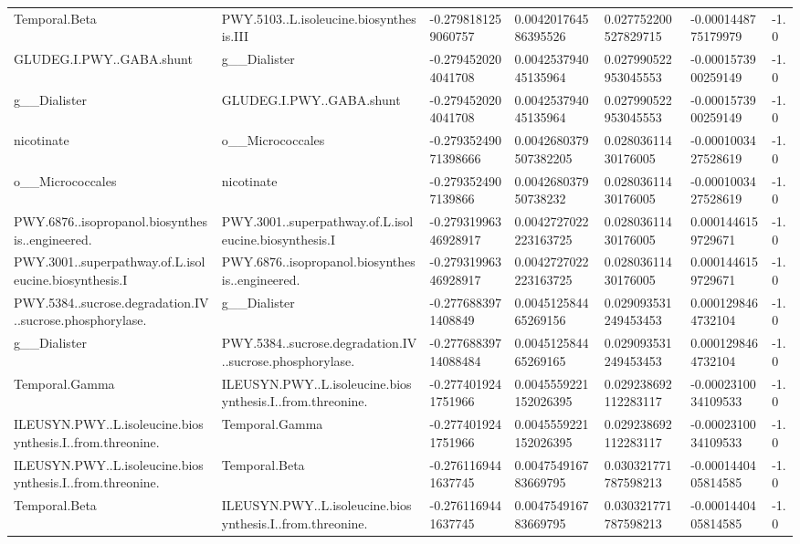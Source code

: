 \begin{longtable}{lllllll}
Temporal.Beta & PWY.5103..L.isoleucine.biosynthesis.III & -0.2798181259060757 & 0.004201764586395526 & 0.027752200527829715 & -0.0001448775179979 & -1.0 \\
GLUDEG.I.PWY..GABA.shunt & g\_\_Dialister & -0.2794520204041708 & 0.004253794045135964 & 0.027990522953045553 & -0.0001573900259149 & -1.0 \\
g\_\_Dialister & GLUDEG.I.PWY..GABA.shunt & -0.2794520204041708 & 0.004253794045135964 & 0.027990522953045553 & -0.0001573900259149 & -1.0 \\
nicotinate & o\_\_Micrococcales & -0.27935249071398666 & 0.0042680379507382205 & 0.02803611430176005 & -0.0001003427528619 & -1.0 \\
o\_\_Micrococcales & nicotinate & -0.2793524907139866 & 0.004268037950738232 & 0.02803611430176005 & -0.0001003427528619 & -1.0 \\
PWY.6876..isopropanol.biosynthesis..engineered. & PWY.3001..superpathway.of.L.isoleucine.biosynthesis.I & -0.27931996346928917 & 0.0042727022223163725 & 0.02803611430176005 & 0.0001446159729671 & -1.0 \\
PWY.3001..superpathway.of.L.isoleucine.biosynthesis.I & PWY.6876..isopropanol.biosynthesis..engineered. & -0.27931996346928917 & 0.0042727022223163725 & 0.02803611430176005 & 0.0001446159729671 & -1.0 \\
PWY.5384..sucrose.degradation.IV..sucrose.phosphorylase. & g\_\_Dialister & -0.2776883971408849 & 0.004512584465269156 & 0.029093531249453453 & 0.0001298464732104 & -1.0 \\
g\_\_Dialister & PWY.5384..sucrose.degradation.IV..sucrose.phosphorylase. & -0.27768839714088484 & 0.004512584465269165 & 0.029093531249453453 & 0.0001298464732104 & -1.0 \\
Temporal.Gamma & ILEUSYN.PWY..L.isoleucine.biosynthesis.I..from.threonine. & -0.2774019241751966 & 0.0045559221152026395 & 0.029238692112283117 & -0.0002310034109533 & -1.0 \\
ILEUSYN.PWY..L.isoleucine.biosynthesis.I..from.threonine. & Temporal.Gamma & -0.2774019241751966 & 0.0045559221152026395 & 0.029238692112283117 & -0.0002310034109533 & -1.0 \\
ILEUSYN.PWY..L.isoleucine.biosynthesis.I..from.threonine. & Temporal.Beta & -0.2761169441637745 & 0.004754916783669795 & 0.030321771787598213 & -0.0001440405814585 & -1.0 \\
Temporal.Beta & ILEUSYN.PWY..L.isoleucine.biosynthesis.I..from.threonine. & -0.2761169441637745 & 0.004754916783669795 & 0.030321771787598213 & -0.0001440405814585 & -1.0 \\

\end{longtable}
